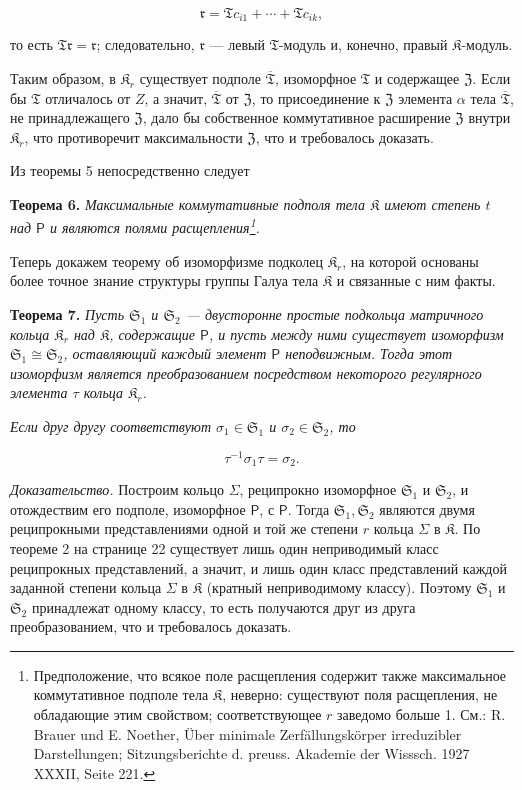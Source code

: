 \documentclass[11pt]{article}
\newcommand{\srcfn}[2]{\footnote{#2}}
\begin{document}
\[
\mathfrak r=\mathfrak T c_{i1}+\cdots+\mathfrak T c_{ik},
\]

то есть \(\mathfrak T\mathfrak r=\mathfrak r\); следовательно, \(\mathfrak r\) --- левый \(\mathfrak T\)-модуль и, конечно, правый \(\mathfrak K\)-модуль.

Таким образом, в \(\mathfrak K_r\) существует подполе \(\overline{\mathfrak T}\), изоморфное \(\mathfrak T\) и содержащее \(\mathfrak Z\). Если бы \(\mathfrak T\) отличалось от \(Z\), а значит, \(\overline{\mathfrak T}\) от \(\mathfrak Z\), то присоединение к \(\mathfrak Z\) элемента \(\alpha\) тела \(\overline{\mathfrak T}\), не принадлежащего \(\mathfrak Z\), дало бы собственное коммутативное расширение \(\mathfrak Z\) внутри \(\mathfrak K_r\), что противоречит максимальности \(\mathfrak Z\), что и требовалось доказать.

Из теоремы 5 непосредственно следует

\textbf{Теорема 6.} \emph{Максимальные коммутативные подполя тела \(\mathfrak K\) имеют степень \(t\) над \(\mathsf P\) и являются полями расщепления\srcfn{1}{Предположение, что всякое поле расщепления содержит также максимальное коммутативное подполе тела \(\mathfrak K\), неверно: существуют поля расщепления, не обладающие этим свойством; соответствующее \(r\) заведомо больше 1. См.: R. Brauer und E. Noether, Über minimale Zerfällungskörper irreduzibler Darstellungen; Sitzungsberichte d. preuss. Akademie der Wisssch. 1927 XXXII, Seite 221.}.}

Теперь докажем теорему об изоморфизме подколец \(\mathfrak K_r\), на которой основаны более точное знание структуры группы Галуа тела \(\mathfrak K\) и связанные с ним факты.

\textbf{Теорема 7.} \emph{Пусть \(\mathfrak S_1\) и \(\mathfrak S_2\) --- двусторонне простые подкольца матричного кольца \(\mathfrak K_r\) над \(\mathfrak K\), содержащие \(\mathsf P\), и пусть между ними существует изоморфизм \(\mathfrak S_1\cong\mathfrak S_2\), оставляющий каждый элемент \(\mathsf P\) неподвижным. Тогда этот изоморфизм является преобразованием посредством некоторого регулярного элемента \(\tau\) кольца \(\mathfrak K_r\).}

\emph{Если друг другу соответствуют \(\sigma_1\in\mathfrak S_1\) и \(\sigma_2\in\mathfrak S_2\), то}

\[
\tau^{-1}\sigma_1\tau=\sigma_2.
\]

\emph{Доказательство.} Построим кольцо \(\Sigma\), реципрокно изоморфное \(\mathfrak S_1\) и \(\mathfrak S_2\), и отождествим его подполе, изоморфное \(\mathsf P\), с \(\mathsf P\). Тогда \(\mathfrak S_1,\mathfrak S_2\) являются двумя реципрокными представлениями одной и той же степени \(r\) кольца \(\Sigma\) в \(\mathfrak K\). По теореме 2 на странице 22 существует лишь один неприводимый класс реципрокных представлений, а значит, и лишь один класс представлений каждой заданной степени кольца \(\Sigma\) в \(\mathfrak K\) (кратный неприводимому классу). Поэтому \(\mathfrak S_1\) и \(\mathfrak S_2\) принадлежат одному классу, то есть получаются друг из друга преобразованием, что и требовалось доказать.
\end{document}
